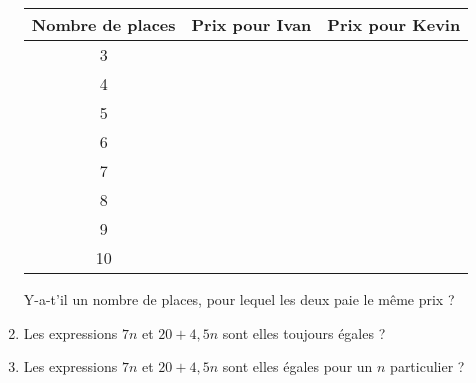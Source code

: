 \documentclass[a4paper,12pt]{article}
\begin{document}
\begin{enumerate}
	      \begin{center}
		      \renewcommand{\arraystretch}{1.5}
		      \begin{tabular}{|c|c|c|}
			      \hline
			      Nombre de places & Prix pour Ivan & Prix pour Kevin
			      \\ \hline
			      3                &                &
			      \\ \hline
			      4                &                &
			      \\ \hline
			      5                &                &
			      \\ \hline
			      6                &                &
			      \\ \hline
			      7                &                &
			      \\ \hline
			      8                &                &
			      \\ \hline
			      9                &                &
			      \\ \hline
			      10               &                &
			      \\ \hline
		      \end{tabular}
	      \end{center}

	      Y-a-t'il un nombre de places, pour lequel les deux paie le même prix ? \dotfill
	\item Les expressions $7n$ et $20 + 4{,}5n$ sont elles toujours égales ?
	\item Les expressions $7n$ et $20 + 4{,}5n$ sont elles égales pour un $n$ particulier ?
\end{enumerate}
\end{document}
